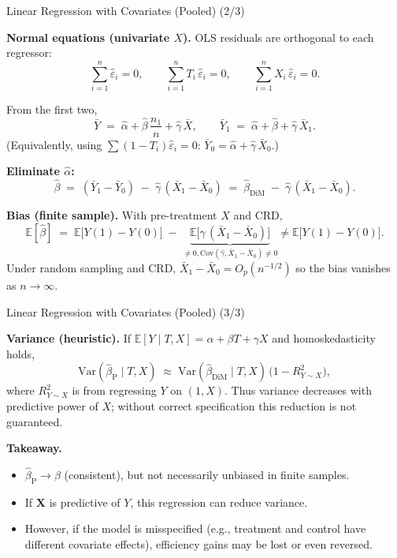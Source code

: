 \documentclass[10pt, handout]{beamer}
\theoremstyle{plain}
\newcommand{\bX}{\bm{X}}
\newcommand{\E}{\mathbb{E}}
\newcommand{\Var}{\mathrm{Var}}
\newcommand{\Cov}{\mathrm{Cov}}
\begin{document}
\begin{frame}{Linear Regression with Covariates (Pooled) (2/3)}
\small

\textbf{Normal equations (univariate \(X\)).} OLS residuals are orthogonal to each regressor:
\[
\sum_{i=1}^n \hat\varepsilon_i = 0, 
\qquad 
\sum_{i=1}^n T_i\,\hat\varepsilon_i = 0, 
\qquad 
\sum_{i=1}^n X_i\,\hat\varepsilon_i = 0.
\]

\pause
\vspace{0.4em}
From the first two,
\[
\bar Y \;=\; \hat\alpha + \hat\beta\,\frac{n_1}{n} + \hat\gamma\,\bar X,
\qquad
\bar Y_1 \;=\; \hat\alpha + \hat\beta + \hat\gamma\,\bar X_1.
\]
(Equivalently, using \(\sum (1-T_i)\hat\varepsilon_i=0\): \(\bar Y_0=\hat\alpha+\hat\gamma\,\bar X_0\).)

\pause
\vspace{0.4em}
\textbf{Eliminate \(\hat\alpha\):}
\[
\hat\beta
\;=\;
(\bar Y_1 - \bar Y_0)\;-\;\hat\gamma\,(\bar X_1 - \bar X_0) \;=\;
\hat\beta_{\text{DiM}}\;-\;\hat\gamma\,(\bar X_1 - \bar X_0).
\]

\pause
\vspace{0.6em}
\textbf{Bias (finite sample).} With pre-treatment \(X\) and CRD,
\[
\E[\hat\beta]
\;=\; \E\!\big[Y(1)-Y(0)\big]
\;-\; \underbrace{\E\!\big[\hat\gamma\,(\bar X_1-\bar X_0)\big]}_{\neq 0, \Cov(\hat\gamma,\bar X_1-\bar X_0)\neq 0} \neq \E\!\big[Y(1)-Y(0)\big].
\]
Under random sampling and CRD, \(\bar X_1-\bar X_0=O_p(n^{-1/2})\) so the bias vanishes as \(n\to\infty\).
\end{frame}

\begin{frame}{Linear Regression with Covariates (Pooled) (3/3)}


\textbf{Variance (heuristic).}
If \(\E[Y\mid T,X]=\alpha+\beta T+\gamma X\) and homoskedasticity holds,
\[
\Var(\hat\beta_{\text{P}} \mid T, X)
\;\approx\;
\Var(\hat\beta_{\text{DiM}} \mid T, X)\,\big(1 - R^2_{Y\sim X}\big),
\]
where \(R^2_{Y\sim X}\) is from regressing \(Y\) on \((1,X)\).
Thus variance decreases with predictive power of \(X\); without correct specification this reduction is not guaranteed.

\pause
\vspace{1em}
\textbf{Takeaway.}
\begin{itemize}
  \item \(\hat\beta_{\text{P}} \to \beta\) (consistent), but not necessarily unbiased in finite samples.
  \pause
  \item If \(\bX\) is predictive of \(Y\), this regression can reduce variance.
  \pause
  \item However, if the model is misspecified (e.g., treatment and control have different covariate effects), efficiency gains may be lost or even reversed.
\end{itemize}
\end{frame}
\end{document}
